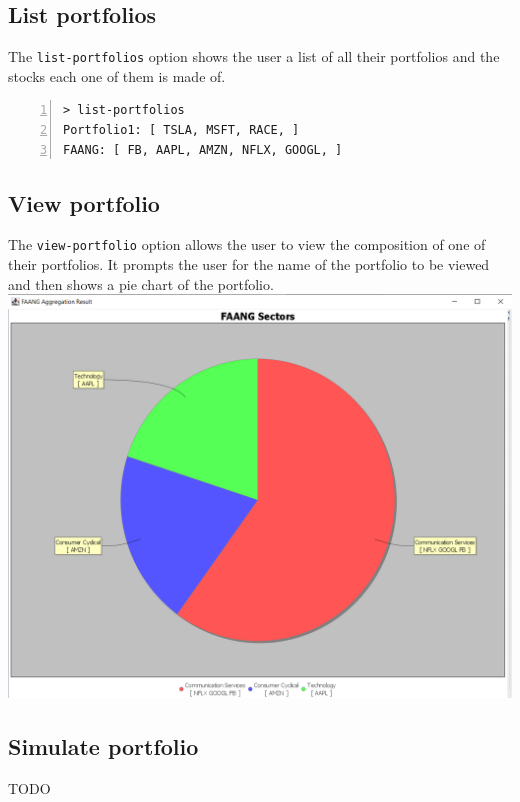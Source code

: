 \subsection{List portfolios}
The \texttt{list-portfolios} option shows the user a list of all their portfolios and the stocks each one of them is made of.\\

\begin{lstlisting}[basicstyle=\footnotesize\ttfamily,language={},numbers=left,
numberstyle=\footnotesize,numbersep=8pt,frame=single]
> list-portfolios
Portfolio1: [ TSLA, MSFT, RACE, ]
FAANG: [ FB, AAPL, AMZN, NFLX, GOOGL, ]
\end{lstlisting}

\subsection{View portfolio}
The \texttt{view-portfolio} option allows the user to view the composition of one of their portfolios. It prompts the user for the name of the portfolio to be viewed and then shows a pie chart of the portfolio.\\

{\centering
\includegraphics[scale=0.32]{img/user_manual/view_portfolio.png}\\
}

\subsection{Simulate portfolio}
TODO

